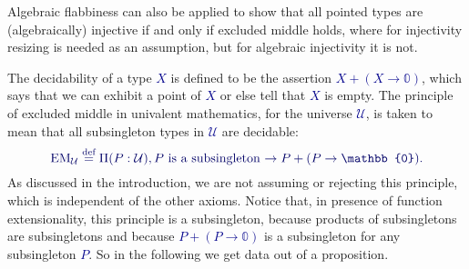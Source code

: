 \documentclass[10pt]{article}
\newcommand{\db}{\textcolor{darkblue}}
\newcommand{\m}[1]{\db{$#1$}}
\newcommand{\M}[1]{\[\db{#1}\]}
\newcommand{\EM}{\operatorname{EM}}
\newcommand{\U}{\mathcal{U}}
\newcommand{\Zero}{\mathbb{0}}
\newcommand{\One}{\mathbb{1}}
\newcommand{\eqdef}{\overset{\text{def}}{=}}
\theoremstyle{definition}
\begin{document}
Algebraic flabbiness can also be applied to show that all pointed
types are (algebraically) injective if and only if excluded middle
holds, where for injectivity resizing is needed as an assumption, but
for algebraic injectivity it is not.

The decidability of a type \m{X} is defined to be the assertion \m{X +
  (X \to \Zero)}, which says that we can exhibit a point of \m{X} or
else tell that \m{X} is empty.
The principle of excluded middle in univalent mathematics, for the
universe \m{\U}, is taken to mean that all subsingleton types in
\m{\U} are decidable:
%
\M{
  \EM_\U \eqdef \Pi (P : \U), \text{\m{P} is a subsingleton \m{\to P + (P \to \Zero)}.}
}
%
As discussed in the introduction, we are not assuming or rejecting
this principle, which is independent of the other axioms. Notice
that, in presence of function extensionality, this principle is
a subsingleton, because products of subsingletons are subsingletons and
because \m{P + (P \to \Zero)} is a subsingleton for any
subsingleton \m{P}. So in the following we get data out of a proposition.
\end{document}
